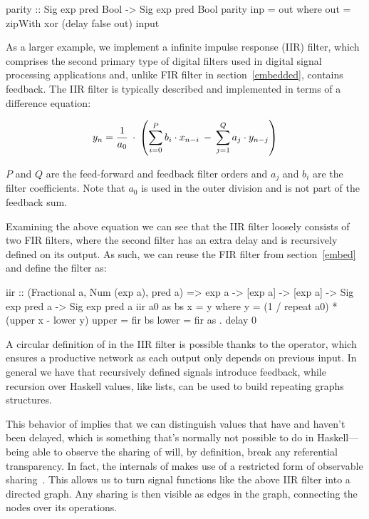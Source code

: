 \documentclass[../paper.tex]{subfiles}
\begin{document}
\begin{code}
parity :: Sig exp pred Bool -> Sig exp pred Bool
parity inp = out where out = zipWith xor (delay false out) input
\end{code}

As a larger example, we implement a infinite impulse response (IIR) filter, which comprises the second primary type of digital filters used in digital signal processing applications and, unlike FIR filter in section~\ref{embedded}, contains feedback. The IIR filter is typically described and implemented in terms of a difference equation:

\begin{equation}
y_{n} = {1 \over a_{0}} \: \cdot \: \left( \sum_{i=0}^{P} b_{i} \cdot x_{n-i} \: - \: \sum_{j=1}^{Q} a_{j} \cdot y_{n-j} \right)
\end{equation}
\vspace{1mm}

\noindent $P$ and $Q$ are the feed-forward and feedback filter orders and $a_{j}$ and $b_{i}$ are the filter coefficients. Note that $a_{0}$ is used in the outer division and is not part of the feedback sum.

Examining the above equation we can see that the IIR filter loosely consists of two FIR filters, where the second filter has an extra delay and is recursively defined on its output. As such, we can reuse the FIR filter from section~\ref{embed} and define the filter as:

\begin{code}
iir :: (Fractional a, Num (exp a), pred a) => exp a -> [exp a] -> [exp a]
  -> Sig exp pred a -> Sig exp pred a
iir a0 as bs x = y
  where
    y = (1 / repeat a0) * (upper x - lower y)
    upper = fir bs
    lower = fir as . delay 0
\end{code}

A circular definition of  in the IIR filter is possible thanks to the  operator, which ensures a productive network as each output only depends on previous input. In general we have that recursively defined signals introduce feedback, while recursion over Haskell values, like lists, can be used to build repeating graphs structures.

This behavior of  implies that we can distinguish values that have and haven't been delayed, which is something that's normally not possible to do in Haskell---being able to observe the sharing of  will, by definition, break any referential transparency. In fact, the internals of  makes use of a restricted form of observable sharing~\cite{claessen1999, gill2009}. This allows us to turn signal functions like the above IIR filter into a directed graph. Any sharing is then visible as edges in the graph, connecting the nodes over its operations.
\end{document}
